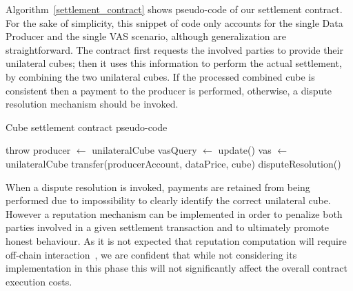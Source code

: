 Algorithm~\ref{settlement_contract} shows pseudo-code of our settlement contract. For the sake of simplicity, this snippet of code only accounts for the single Data Producer and the single VAS scenario, although generalization are straightforward.
The contract first requests the involved parties to provide their unilateral cubes; then it uses this information to perform the actual settlement, by combining the two unilateral cubes. If the processed combined cube is consistent then a payment to the producer is performed, otherwise, a dispute resolution mechanism should be invoked.
%
\begin{algorithm}
	\caption{Cube settlement contract pseudo-code}\label{settlement_contract}
\begin{algorithmic}
	\STATE throw
	\STATE producer $\gets$ unilateralCube
	\STATE vasQuery $\gets$ update()
	\STATE vas $\gets$ unilateralCube
	\STATE transfer(producerAccount, dataPrice, cube)
	\ELSE
	\STATE disputeResolution()
	\ENDIF
	\ENDIF
	\ENDIF
\end{algorithmic}
\end{algorithm}
%
When a dispute resolution is invoked, payments are retained from being performed due to impossibility to clearly identify the correct unilateral cube. However a reputation mechanism can be implemented in order to penalize both parties involved in a given settlement transaction and to ultimately promote honest behaviour. As it is not expected that reputation computation will require off-chain interaction~\cite{schaub2016trustless,carboni2015feedback}, we are confident that while not considering its implementation in this phase this will not significantly affect the overall contract execution costs.


